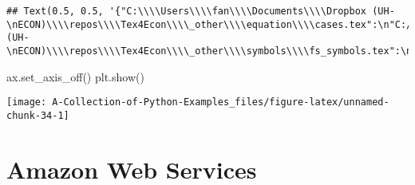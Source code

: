 \documentclass[
]{book}
\newenvironment{Shaded}{\begin{snugshade}}{\end{snugshade}}
\newcommand{\NormalTok}[1]{#1}
\begin{document}
\begin{verbatim}
## Text(0.5, 0.5, '{"C:\\\\Users\\\\fan\\\\Documents\\\\Dropbox (UH-\nECON)\\\\repos\\\\Tex4Econ\\\\_other\\\\equation\\\\cases.tex":\n"C:/Users/fan/Documents/cases.pdf",\n"C:\\\\Users\\\\fan\\\\Documents\\\\Dropbox (UH-\nECON)\\\\repos\\\\Tex4Econ\\\\_other\\\\symbols\\\\fs_symbols.tex":\n"C:/Users/fan/Documents/fs_symbols.pdf"}')
\end{verbatim}

\begin{Shaded}
\begin{Highlighting}[]
\NormalTok{ax.set_axis_off()}
\NormalTok{plt.show()}
\end{Highlighting}
\end{Shaded}

\begin{center}\texttt{[image: A-Collection-of-Python-Examples\_files/figure-latex/unnamed-chunk-34-1]} \end{center}

\hypertarget{amazon-web-services}{%
\chapter{Amazon Web Services}\label{amazon-web-services}}
\end{document}
